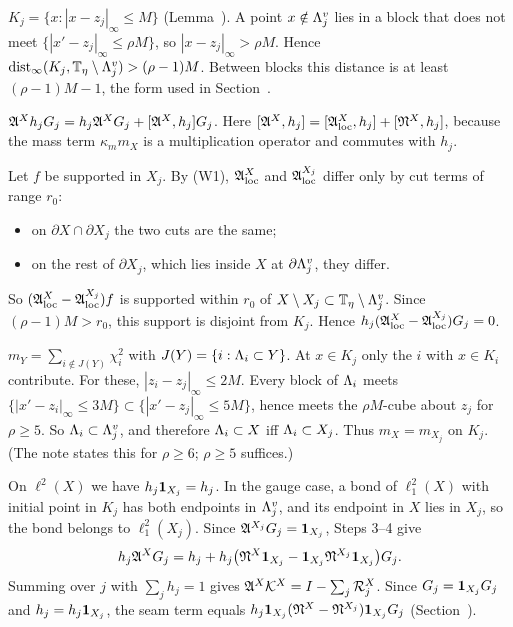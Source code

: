 \begin{detail}\label{d9:parametrix}
\begin{step}
$K_j=\{x:|x-z_j|_\infty\le M\}$ (Lemma~). A point $x\notin\Lambda^v_j$ lies in a block that does not meet $\{|x'-z_j|_\infty\le\rho M\}$, so $|x-z_j|_\infty>\rho M$. Hence $\operatorname{dist}_\infty(K_j,\mathbb T_\eta\setminus\Lambda^v_j)>(\rho-1)M$. Between blocks this distance is at least $(\rho-1)M-1$, the form used in Section~.
\end{step}
\begin{step}[Commutator]
$\mathfrak A^Xh_jG_j=h_j\mathfrak A^XG_j+[\mathfrak A^X,h_j]G_j$. Here $[\mathfrak A^X,h_j]=[\mathfrak A^X_{\rm loc},h_j]+[\mathfrak N^X,h_j]$, because the mass term $\kappa_mm_X$ is a multiplication operator and commutes with $h_j$.
\end{step}
\begin{step}
Let $f$ be supported in $X_j$. By (W1), $\mathfrak A^X_{\rm loc}$ and $\mathfrak A^{X_j}_{\rm loc}$ differ only by cut terms of range $r_0$:
\begin{itemize}
\item on $\partial X\cap\partial X_j$ the two cuts are the same;
\item on the rest of $\partial X_j$, which lies inside $X$ at $\partial\Lambda^v_j$, they differ.
\end{itemize}
So $(\mathfrak A^X_{\rm loc}-\mathfrak A^{X_j}_{\rm loc})f$ is supported within $r_0$ of $X\setminus X_j\subset\mathbb T_\eta\setminus\Lambda^v_j$. Since $(\rho-1)M>r_0$, this support is disjoint from $K_j$. Hence $h_j(\mathfrak A^X_{\rm loc}-\mathfrak A^{X_j}_{\rm loc})G_j=0$.
\end{step}
\begin{step}
$m_Y=\sum_{i\notin J(Y)}\chi_i^2$ with $J(Y)=\{i:\Lambda_i\subset Y\}$. At $x\in K_j$ only the $i$ with $x\in K_i$ contribute. For these, $|z_i-z_j|_\infty\le2M$. Every block of $\Lambda_i$ meets $\{|x'-z_i|_\infty\le3M\}\subset\{|x'-z_j|_\infty\le5M\}$, hence meets the $\rho M$-cube about $z_j$ for $\rho\ge5$. So $\Lambda_i\subset\Lambda^v_j$, and therefore $\Lambda_i\subset X$ iff $\Lambda_i\subset X_j$. Thus $m_X=m_{X_j}$ on $K_j$. (The note states this for $\rho\ge6$; $\rho\ge5$ suffices.)
\end{step}
\begin{step}[Conclusion]
On $\ell^2(X)$ we have $h_j\mathbf 1_{X_j}=h_j$. In the gauge case, a bond of $\ell^2_1(X)$ with initial point in $K_j$ has both endpoints in $\Lambda^v_j$, and its endpoint in $X$ lies in $X_j$, so the bond belongs to $\ell^2_1(X_j)$. Since $\mathfrak A^{X_j}G_j=\mathbf 1_{X_j}$, Steps 3--4 give
\[
h_j\mathfrak A^XG_j=h_j+h_j\big(\mathfrak N^X\mathbf 1_{X_j}-\mathbf 1_{X_j}\mathfrak N^{X_j}\mathbf 1_{X_j}\big)G_j .
\]
Summing over $j$ with $\sum_jh_j=1$ gives $\mathfrak A^X\mathcal K^X=I-\sum_j\mathcal R^X_j$. Since $G_j=\mathbf 1_{X_j}G_j$ and $h_j=h_j\mathbf 1_{X_j}$, the seam term equals $h_j\mathbf 1_{X_j}(\mathfrak N^X-\mathfrak N^{X_j})\mathbf 1_{X_j}G_j$ (Section~).
\end{step}
\end{detail}

